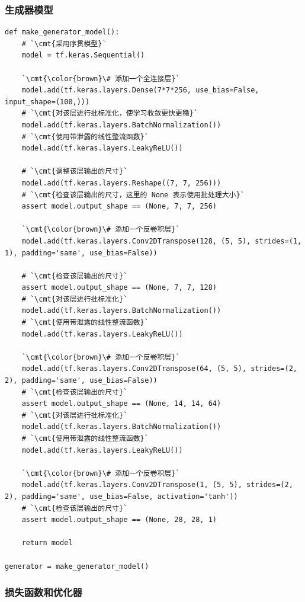 \documentclass[a4paper, 12pt]{article}
\begin{document}
\subsubsection{生成器模型}
\begin{lstlisting}[style=myPython,caption={创建生成器模型}]
def make_generator_model():
    # `\cmt{采用序贯模型}`
    model = tf.keras.Sequential()

    `\cmt{\color{brown}\# 添加一个全连接层}`
    model.add(tf.keras.layers.Dense(7*7*256, use_bias=False, input_shape=(100,)))
    # `\cmt{对该层进行批标准化，使学习收敛更快更稳}`
    model.add(tf.keras.layers.BatchNormalization())
    # `\cmt{使用带泄露的线性整流函数}`
    model.add(tf.keras.layers.LeakyReLU())

    # `\cmt{调整该层输出的尺寸}`
    model.add(tf.keras.layers.Reshape((7, 7, 256)))
    # `\cmt{检查该层输出的尺寸，这里的 None 表示使用批处理大小}`
    assert model.output_shape == (None, 7, 7, 256) 
    
    `\cmt{\color{brown}\# 添加一个反卷积层}`
    model.add(tf.keras.layers.Conv2DTranspose(128, (5, 5), strides=(1, 1), padding='same', use_bias=False))

    # `\cmt{检查该层输出的尺寸}`
    assert model.output_shape == (None, 7, 7, 128)
    # `\cmt{对该层进行批标准化}`
    model.add(tf.keras.layers.BatchNormalization())
    # `\cmt{使用带泄露的线性整流函数}`
    model.add(tf.keras.layers.LeakyReLU())

    `\cmt{\color{brown}\# 添加一个反卷积层}`
    model.add(tf.keras.layers.Conv2DTranspose(64, (5, 5), strides=(2, 2), padding='same', use_bias=False))
    # `\cmt{检查该层输出的尺寸}`
    assert model.output_shape == (None, 14, 14, 64)
    # `\cmt{对该层进行批标准化}`
    model.add(tf.keras.layers.BatchNormalization())
    # `\cmt{使用带泄露的线性整流函数}`
    model.add(tf.keras.layers.LeakyReLU())

    `\cmt{\color{brown}\# 添加一个反卷积层}`
    model.add(tf.keras.layers.Conv2DTranspose(1, (5, 5), strides=(2, 2), padding='same', use_bias=False, activation='tanh'))
    # `\cmt{检查该层输出的尺寸}`
    assert model.output_shape == (None, 28, 28, 1)

    return model

generator = make_generator_model()
\end{lstlisting}


\subsubsection{损失函数和优化器}
\end{document}
